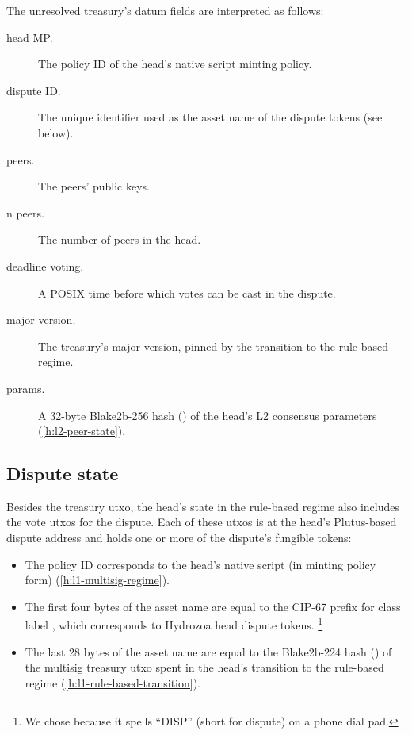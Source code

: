 \documentclass[../hydrozoa.tex]{subfiles}
\begin{document}
The unresolved treasury's datum fields are interpreted as follows:
\begin{description}
  \item[head MP.] The policy ID of the head's native script minting policy.
  \item[dispute ID.] The unique identifier used as the asset name of the dispute tokens (see below).
  \item[peers.] The peers' public keys.
  \item[n peers.] The number of peers in the head.
  \item[deadline voting.] A POSIX time before which votes can be cast in the dispute.
  \item[major version.] The treasury's major version, pinned by the transition to the rule-based regime.
  \item[params.] A 32-byte Blake2b-256 hash () of the head's L2 consensus parameters (\cref{h:l2-peer-state}).
\end{description}

\subsection{Dispute state}

Besides the treasury utxo, the head's state in the rule-based regime also includes the vote utxos for the dispute.
Each of these utxos is at the head's Plutus-based dispute address and holds one or more of the dispute's fungible tokens:
\begin{itemize}
  \item The policy ID corresponds to the head's native script (in minting policy form) (\cref{h:l1-multisig-regime}).
  \item The first four bytes of the asset name are equal to the CIP-67
    \citep{AlessandroKonradThomasVellekoopCIP67AssetName2022}
    prefix for class label \headDisputeToken{}, which corresponds to Hydrozoa head dispute tokens.%
    \footnote{We chose \headDisputeToken{} because it spells ``DISP'' (short for dispute) on a phone dial pad.}
  \item The last 28 bytes of the asset name are equal to the Blake2b-224 hash () of the multisig treasury utxo spent in the head's transition to the rule-based regime (\cref{h:l1-rule-based-transition}).
\end{itemize}
\end{document}
